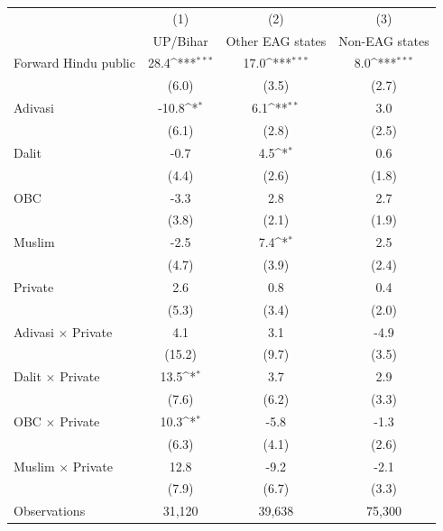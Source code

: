{
\def\sym#1{\ifmmode^{#1}\else\(^{#1}\)\fi}
\begin{tabular}{l*{3}{c}}
\toprule
                    &\multicolumn{1}{c}{(1)}&\multicolumn{1}{c}{(2)}&\multicolumn{1}{c}{(3)}\\
                    &\multicolumn{1}{c}{UP/Bihar}&\multicolumn{1}{c}{Other EAG states}&\multicolumn{1}{c}{Non-EAG states}\\
\midrule
Forward Hindu public&        28.4\sym{***}&        17.0\sym{***}&         8.0\sym{***}\\
                    &       (6.0)         &       (3.5)         &       (2.7)         \\
\addlinespace
Adivasi             &       -10.8\sym{*}  &         6.1\sym{**} &         3.0         \\
                    &       (6.1)         &       (2.8)         &       (2.5)         \\
\addlinespace
Dalit               &        -0.7         &         4.5\sym{*}  &         0.6         \\
                    &       (4.4)         &       (2.6)         &       (1.8)         \\
\addlinespace
OBC                 &        -3.3         &         2.8         &         2.7         \\
                    &       (3.8)         &       (2.1)         &       (1.9)         \\
\addlinespace
Muslim              &        -2.5         &         7.4\sym{*}  &         2.5         \\
                    &       (4.7)         &       (3.9)         &       (2.4)         \\
\addlinespace
Private             &         2.6         &         0.8         &         0.4         \\
                    &       (5.3)         &       (3.4)         &       (2.0)         \\
\addlinespace
Adivasi $\times$ Private&         4.1         &         3.1         &        -4.9         \\
                    &      (15.2)         &       (9.7)         &       (3.5)         \\
\addlinespace
Dalit $\times$ Private&        13.5\sym{*}  &         3.7         &         2.9         \\
                    &       (7.6)         &       (6.2)         &       (3.3)         \\
\addlinespace
OBC $\times$ Private&        10.3\sym{*}  &        -5.8         &        -1.3         \\
                    &       (6.3)         &       (4.1)         &       (2.6)         \\
\addlinespace
Muslim $\times$ Private&        12.8         &        -9.2         &        -2.1         \\
                    &       (7.9)         &       (6.7)         &       (3.3)         \\
\midrule
Observations        &      31,120         &      39,638         &      75,300         \\
\bottomrule
\end{tabular}
}

